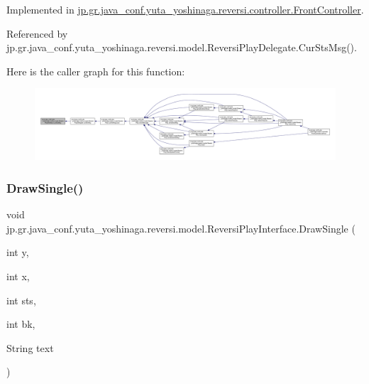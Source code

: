 Implemented in \hyperlink{classjp_1_1gr_1_1java__conf_1_1yuta__yoshinaga_1_1reversi_1_1controller_1_1_front_controller_a49315230e704778721afb73c59e14d88}{jp.\+gr.\+java\+\_\+conf.\+yuta\+\_\+yoshinaga.\+reversi.\+controller.\+Front\+Controller}.



Referenced by jp.\+gr.\+java\+\_\+conf.\+yuta\+\_\+yoshinaga.\+reversi.\+model.\+Reversi\+Play\+Delegate.\+Cur\+Sts\+Msg().

Here is the caller graph for this function\+:
\nopagebreak
\begin{figure}[H]
\begin{center}
\leavevmode
\includegraphics[width=350pt]{interfacejp_1_1gr_1_1java__conf_1_1yuta__yoshinaga_1_1reversi_1_1model_1_1_reversi_play_interface_ad812b3735df400b42916b15e5c3ff9db_icgraph}
\end{center}
\end{figure}
\mbox{\label{interfacejp_1_1gr_1_1java__conf_1_1yuta__yoshinaga_1_1reversi_1_1model_1_1_reversi_play_interface_a6b51f93e409bbc76092e12a68c6fe710}} 
\subsubsection{\texorpdfstring{Draw\+Single()}{DrawSingle()}}
{\footnotesize\ttfamily void jp.\+gr.\+java\+\_\+conf.\+yuta\+\_\+yoshinaga.\+reversi.\+model.\+Reversi\+Play\+Interface.\+Draw\+Single (\begin{DoxyParamCaption}\item[{int}]{y,  }\item[{int}]{x,  }\item[{int}]{sts,  }\item[{int}]{bk,  }\item[{String}]{text }\end{DoxyParamCaption})}



